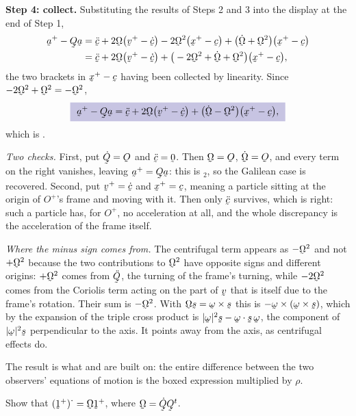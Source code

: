 \begin{solution}
\textbf{Step 4: collect.} Substituting the results of Steps 2 and 3 into
the display at the end of Step 1,
\[
\begin{aligned}
   \ba^{+}-\bQ\ba&=\ddot\bc
     +2\bOm\big(\bv^{+}-\dot\bc\big)-2\bOm^{2}\big(\bx^{+}-\bc\big)
     +\big(\dot\bOm+\bOm^{2}\big)\big(\bx^{+}-\bc\big)\\
   &=\ddot\bc+2\bOm\big(\bv^{+}-\dot\bc\big)
     +\big(-2\bOm^{2}+\dot\bOm+\bOm^{2}\big)\big(\bx^{+}-\bc\big),
\end{aligned}
\]
the two brackets in $\bx^{+}-\bc$ having been collected by linearity.
Since $-2\bOm^{2}+\bOm^{2}=-\bOm^{2}$,
\[
   \boxed{\ \ba^{+}-\bQ\ba=\ddot\bc+2\bOm\big(\bv^{+}-\dot\bc\big)
   +\big(\dot\bOm-\bOm^{2}\big)\big(\bx^{+}-\bc\big),\ }
\]
which is .

\emph{Two checks.} First, put $\dot\bQ=\Ob$ and $\ddot\bc=\bze$. Then
$\bOm=\Ob$, $\dot\bOm=\Ob$, and every term on the right vanishes, leaving
$\ba^{+}=\bQ\ba$: this is $_{2}$, so the Galilean case is
recovered. Second, put $\bv^{+}=\dot\bc$ and $\bx^{+}=\bc$, meaning a
particle sitting at the origin of $O^{+}$'s frame and moving with it.
Then only $\ddot\bc$ survives, which is right: such a particle has, for
$O^{+}$, no acceleration at all, and the whole discrepancy is the
acceleration of the frame itself.

\emph{Where the minus sign comes from.} The centrifugal term appears as
$-\bOm^{2}$ and not $+\bOm^{2}$ because the two contributions to
$\bOm^{2}$ have opposite signs and different origins: $+\bOm^{2}$ comes
from $\ddot\bQ$, the turning of the frame's turning, while $-2\bOm^{2}$
comes from the Coriolis term acting on the part of $\bv$ that is itself
due to the frame's rotation. Their sum is $-\bOm^{2}$. With
$\bOm\bs=\bom\times\bs$ this is $-\bom\times(\bom\times\bs)$, which by
the expansion of the triple cross product is
$|\bom|^{2}\bs-\ip\bom\bs\,\bom$, the component of $|\bom|^{2}\bs$
perpendicular to the axis. It points away from the axis, as centrifugal
effects do.

The result is what  and  are built on: the entire
difference between the two observers' equations of motion is the boxed
expression multiplied by $\rho$.
\end{solution}

\begin{problem}
Show that $(\shift^{+})^{\textstyle\cdot}=\bOm\shift^{+}$, where
$\bOm=\dot\bQ\bQ^{t}$.
\end{problem}

